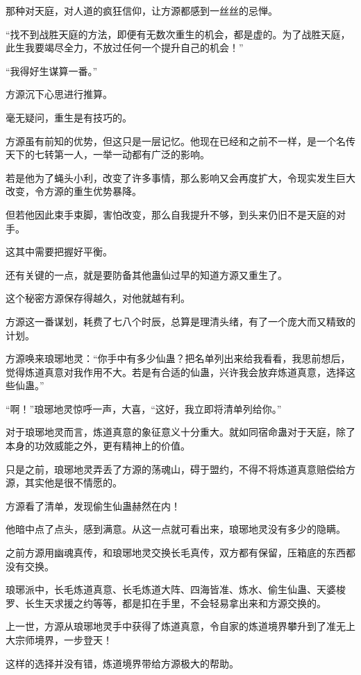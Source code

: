 \begin{this_body}
那种对天庭，对人道的疯狂信仰，让方源都感到一丝丝的忌惮。

“找不到战胜天庭的方法，即便有无数次重生的机会，都是虚的。为了战胜天庭，此生我要竭尽全力，不放过任何一个提升自己的机会！”

“我得好生谋算一番。”

方源沉下心思进行推算。

毫无疑问，重生是有技巧的。

方源虽有前知的优势，但这只是一层记忆。他现在已经和之前不一样，是一个名传天下的七转第一人，一举一动都有广泛的影响。

若是他为了蝇头小利，改变了许多事情，那么影响又会再度扩大，令现实发生巨大改变，令方源的重生优势暴降。

但若他因此束手束脚，害怕改变，那么自我提升不够，到头来仍旧不是天庭的对手。

这其中需要把握好平衡。

还有关键的一点，就是要防备其他蛊仙过早的知道方源又重生了。

这个秘密方源保存得越久，对他就越有利。

方源这一番谋划，耗费了七八个时辰，总算是理清头绪，有了一个庞大而又精致的计划。

方源唤来琅琊地灵：“你手中有多少仙蛊？把名单列出来给我看看，我思前想后，觉得炼道真意对我作用不大。若是有合适的仙蛊，兴许我会放弃炼道真意，选择这些仙蛊。”

“啊！”琅琊地灵惊呼一声，大喜，“这好，我立即将清单列给你。”

对于琅琊地灵而言，炼道真意的象征意义十分重大。就如同宿命蛊对于天庭，除了本身的功效威能之外，更有精神上的价值。

只是之前，琅琊地灵弄丢了方源的荡魂山，碍于盟约，不得不将炼道真意赔偿给方源，其实他是很不情愿的。

方源看了清单，发现偷生仙蛊赫然在内！

他暗中点了点头，感到满意。从这一点就可看出来，琅琊地灵没有多少的隐瞒。

之前方源用幽魂真传，和琅琊地灵交换长毛真传，双方都有保留，压箱底的东西都没有交换。

琅琊派中，长毛炼道真意、长毛炼道大阵、四海皆准、炼水、偷生仙蛊、天婆梭罗、长生天求援之约等等，都是扣在手里，不会轻易拿出来和方源交换的。

上一世，方源从琅琊地灵手中获得了炼道真意，令自家的炼道境界攀升到了准无上大宗师境界，一步登天！

这样的选择并没有错，炼道境界带给方源极大的帮助。


\end{this_body}
